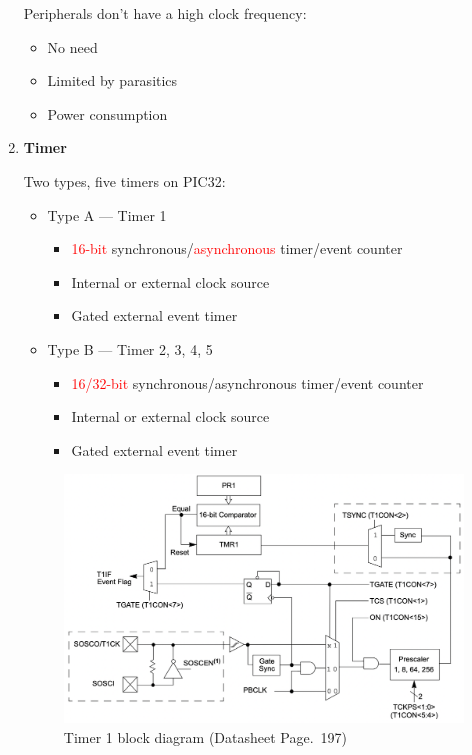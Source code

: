 \documentclass[a4paper]{article}
\begin{document}
\begin{enumerate}[label = \arabic*.]
      \par Peripherals don't have a high clock frequency:
      \begin{itemize}[leftmargin = 1cm]
        \item No need
        \item Limited by parasitics
        \item Power consumption
      \end{itemize}
    \item \textbf{Timer}
      \par Two types, five timers on PIC32:
      \begin{itemize}[leftmargin = 1cm]
        \item Type A --- Timer 1
          \begin{itemize}[leftmargin = 1cm]
            \item \textcolor{red}{16-bit} synchronous/\textcolor{red}{asynchronous} timer/event counter
            \item Internal or external clock source
            \item Gated external event timer
          \end{itemize}
        \item Type B --- Timer 2, 3, 4, 5
          \begin{itemize}[leftmargin = 1cm]
            \item \textcolor{red}{16/32-bit} synchronous/asynchronous timer/event counter
            \item Internal or external clock source
            \item Gated external event timer
          \end{itemize}
      \end{itemize}
      \begin{figure}[H]
        \centering
        \includegraphics[width=0.9\linewidth]{Timer1_block_diagram.png}
        \caption{Timer 1 block diagram (Datasheet Page.~197)}
        \label{fig:Timer1_block_diagram.png}
      \end{figure}


\end{enumerate}
\end{document}
